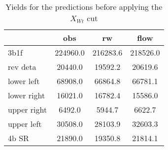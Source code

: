 \begin{table}
\centering
\caption{Yields for the predictions before applying the $X_{Wt}$ cut}
\label{tab:ks}
\begin{tabular}{lccc}
\toprule
{} &      obs &       rw &     flow \\
\midrule
3b1f        & 224960.0 & 216283.6 & 218526.0 \\
rev deta    &  20440.0 &  19592.2 &  20619.6 \\
lower left  &  68908.0 &  66864.8 &  66781.1 \\
lower right &  16021.0 &  16782.4 &  15586.0 \\
upper right &   6492.0 &   5944.7 &   6622.7 \\
upper left  &  30508.0 &  28103.9 &  32603.3 \\
4b SR       &  21890.0 &  19350.8 &  21814.1 \\
\bottomrule
\end{tabular}
\end{table}
